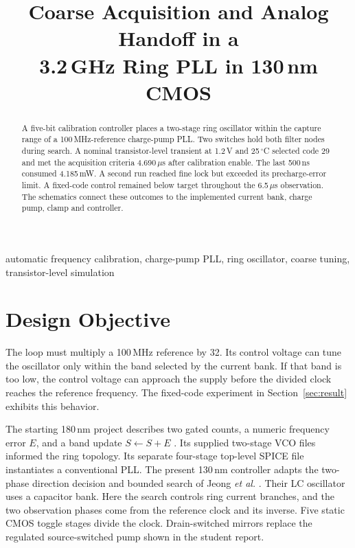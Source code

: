 \documentclass[10pt,conference,letterpaper]{IEEEtran}
\title{Coarse Acquisition and Analog Handoff in a\\3.2\,GHz Ring PLL in 130\,nm CMOS}
\author{\IEEEauthorblockN{PLL130-AFC Project}\IEEEauthorblockA{Design and verification report}}
\begin{document}
\maketitle
\begin{abstract}
A five-bit calibration controller places a two-stage ring oscillator within the capture range of a 100\,MHz-reference charge-pump PLL. Two switches hold both filter nodes during search. A nominal transistor-level transient at 1.2\,V and 25\,$^\circ$C selected code 29 and met the acquisition criteria 4.690\,$\mu$s after calibration enable. The last 500\,ns consumed 4.185\,mW. A second run reached fine lock but exceeded its precharge-error limit. A fixed-code control remained below target throughout the 6.5\,$\mu$s observation. The schematics connect these outcomes to the implemented current bank, charge pump, clamp and controller.
\end{abstract}
\begin{IEEEkeywords}
automatic frequency calibration, charge-pump PLL, ring oscillator, coarse tuning, transistor-level simulation
\end{IEEEkeywords}
\section{Design Objective}
The loop must multiply a 100\,MHz reference by 32. Its control voltage can tune the oscillator only within the band selected by the current bank. If that band is too low, the control voltage can approach the supply before the divided clock reaches the reference frequency. The fixed-code experiment in Section~\ref{sec:result} exhibits this behavior.

The starting 180\,nm project describes two gated counts, a numeric frequency error $E$, and a band update $S\leftarrow S+E$ \cite{student}. Its supplied two-stage VCO files informed the ring topology. Its separate four-stage top-level SPICE file instantiates a conventional PLL. The present 130\,nm controller adapts the two-phase direction decision and bounded search of Jeong \emph{et al.} \cite{jeong}. Their LC oscillator uses a capacitor bank. Here the search controls ring current branches, and the two observation phases come from the reference clock and its inverse. Five static CMOS toggle stages divide the clock. Drain-switched mirrors replace the regulated source-switched pump shown in the student report.
\end{document}
